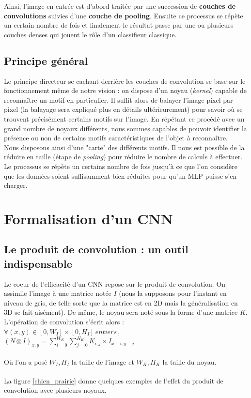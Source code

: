 Ainsi, l'image en entrée est d'abord traitée par une succession de \textbf{couches de convolutions} suivies d'une \textbf{couche de pooling}. Ensuite ce processus se répète un certain nombre de fois et finalement le résultat passe par une ou plusieurs couches denses qui jouent le rôle d'un classifieur classique.

\subsection{Principe général}
Le principe directeur se cachant derrière les couches de convolution se base sur le fonctionnement même de notre vision : on dispose d'un noyau (\textit{kernel}) capable de reconnaître un motif en particulier. Il suffit alors de balayer l'image pixel par pixel (la balayage sera expliqué plus en détails ultérieurement) pour savoir où se trouvent précisément certains motifs sur l'image. En répétant ce procédé avec un grand nombre de noyaux différents, nous sommes capables de pouvoir identifier la présence ou non de certains motifs caractéristiques de l'objet à reconnaître. \\
Nous disposons ainsi d'une "carte" des différents motifs. Il nous est possible de la réduire en taille (étape de \textit{pooling}) pour réduire le nombre de calculs à effectuer. 
Le processus se répète un certains nombre de fois jusqu'à ce que l'on considère que les données soient suffisamment bien réduites pour qu'un MLP puisse s'en charger. 

\section{Formalisation d'un CNN}

\subsection{Le produit de convolution : un outil indispensable}

Le coeur de l'efficacité d'un CNN repose sur le produit de convolution. On assimile l'image à une matrice notée $I$ (nous la supposons pour l'instant en niveau de gris, de telle sorte que la matrice est en 2D mais la généralisation en 3D se fait aisément). De même, le noyau sera noté sous la forme d'une matrice $K$.
L'opération de convolution s'écrit alors : \\

$\forall (x,y) \in [0,W_I] \times [0,H_I] \, entiers \, $,  $(N \otimes I)_{x,y} = \sum_{i=0}^{W_K} \sum_{j=0}^{H_K} K_{i,j} \times I_{x-i,y-j}$ \\
\\
Où l'on a posé $W_I,H_I$ la taille de l'image et $W_K,H_K$ la taille du noyau. \\
\\
La figure \ref{chien_prairie} donne quelques exemples de l'effet du produit de convolution avec plusieurs noyaux.

